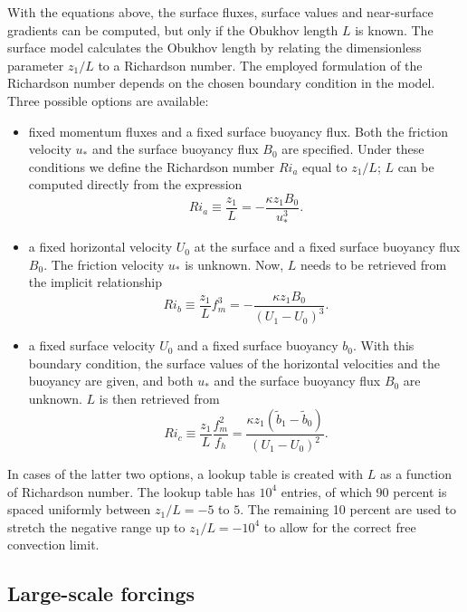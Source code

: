 \documentclass[gmd,manuscript]{copernicus}
\begin{document}
With the equations above, the surface fluxes, surface values and near-surface gradients can be computed, but only if the Obukhov length $L$ is known. The surface model calculates the Obukhov length by relating the dimensionless parameter $z_1/ L$ to a Richardson number. The employed formulation of the Richardson number depends on the chosen boundary condition in the model. Three possible options are available:
\begin{itemize}
	\item fixed momentum fluxes and a fixed surface buoyancy flux. Both the friction velocity $u_*$ and the surface buoyancy flux $B_0$ are specified. Under these conditions we define the Richardson number $Ri_a$ equal to $z_1/L$; $L$ can be computed directly from the expression
	\begin{equation}
	Ri_a \equiv \dfrac{z_1}{L} = - \dfrac{\kappa z_1 B_0}{u_*^3}.
	\end{equation}
	\item a fixed horizontal velocity $U_0$ at the surface and a fixed surface buoyancy flux $B_0$. The friction velocity $u_*$ is unknown. Now,  $L$ needs to be retrieved from the implicit relationship 
	\begin{equation}
	Ri_b \equiv \dfrac{z_1}{L} f_m^3 = - \dfrac{\kappa z_1 B_0}{ \left(U_1 - U_0 \right)^3}.
	\end{equation}
	\item a fixed surface velocity $U_0$ and a fixed surface buoyancy $b_0$. With this boundary condition, the surface values of the horizontal velocities and the buoyancy are given, and both $u_*$ and the surface buoyancy flux $B_0$ are unknown. $L$ is then retrieved from
	\begin{equation}
	Ri_c \equiv \dfrac{z_1}{L} \dfrac{f_m^2}{f_h} = \dfrac{\kappa z_1 \left(\widetilde{b}_1 - \widetilde{b}_0 \right)}{ \left(U_1 - U_0 \right)^2}.
	\end{equation}
\end{itemize}
In cases of the latter two options, a lookup table is created  with $L$ as a function of Richardson number. The lookup table has $10^4$ entries, of which 90 percent is spaced uniformly between $z_1/L = -5$ to $5$. The remaining 10 percent are used to stretch the negative range up to $z_1/L = -10^4$ to allow for the correct free convection limit.

\subsection{Large-scale forcings}
\end{document}
